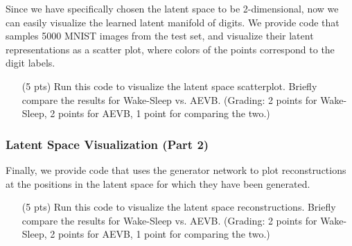 Since we have specifically chosen the latent space to be 2-dimensional, now we can easily visualize the learned latent manifold of digits. We provide code that samples 5000 MNIST images from the test set, and visualize their latent representations as a scatter plot, where colors of the points correspond to the digit labels.

\begin{itemize}
    \item[(5 pts)] Run this code to visualize the latent space scatterplot. Briefly compare the results for Wake-Sleep vs. AEVB. (Grading: 2 points for Wake-Sleep, 2 points for AEVB, 1 point for comparing the two.)
\end{itemize}

\begin{solution}  
\end{solution}

\subsubsection{Latent Space Visualization (Part 2)}

Finally, we provide code that uses the generator network to plot reconstructions at the positions in the latent space for which they have been generated.

\begin{itemize}
    \item[(5 pts)] Run this code to visualize the latent space reconstructions. Briefly compare the results for Wake-Sleep vs. AEVB. (Grading: 2 points for Wake-Sleep, 2 points for AEVB, 1 point for comparing the two.)
\end{itemize}

\begin{solution}
\end{solution}
